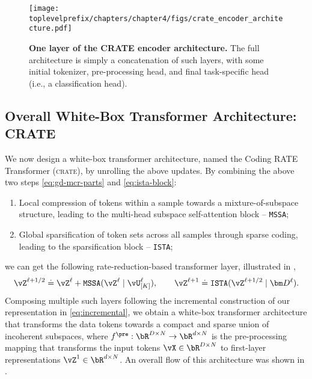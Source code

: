 \documentclass[../../book-main.tex]{subfiles}
\begin{document}
\begin{figure}
     \centering
     \texttt{[image: \\toplevelprefix/chapters/chapter4/figs/crate\_encoder\_architecture.pdf]}
    \caption{\small \textbf{One layer of the CRATE encoder architecture.} The full architecture is simply a concatenation of such layers, with some initial tokenizer, pre-processing head, and final task-specific head (i.e., a classification head).}
    \label{fig:crate_backbone}
\end{figure}



\subsection{Overall White-Box Transformer Architecture: CRATE}

We now design a white-box transformer architecture, named the Coding RATE Transformer (\textsc{crate}), by unrolling the above updates. By combining the above two steps \eqref{eq:gd-mcr-parts} and \eqref{eq:ista-block}:
\begin{enumerate}[leftmargin=0.7cm]
    \item Local compression of tokens within a sample towards a mixture-of-subspace structure, leading to the multi-head subspace self-attention block -- \texttt{MSSA};
    \item Global sparsification of token sets across all samples through sparse coding, leading to the sparsification block -- \texttt{ISTA};
\end{enumerate}
we can get the following rate-reduction-based transformer layer, illustrated in , 
\begin{equation}
    \vZ^{\ell+1/2} \doteq \vZ^{\ell} + \texttt{MSSA}(\vZ^{\ell} \mid \vU_{[K]}^{\ell}), 
    \qquad 
    \vZ^{\ell+1}\doteq \texttt{ISTA}(\vZ^{\ell+1/2} \mid \bm D^\ell).
\end{equation}
Composing multiple such layers following the incremental construction of our representation in \eqref{eq:incremental}, we obtain a white-box transformer architecture that transforms the data tokens towards a compact and sparse union of incoherent subspaces, where $f^{\pre}: \bR^{D \times N} \rightarrow \bR^{d \times N}$ is the pre-processing mapping that transforms the input tokens $\vX \in \bR^{D \times N}$ to first-layer representations $\vZ^{1} \in \bR^{d \times N}$. An overall flow of this architecture was shown in .
\end{document}
